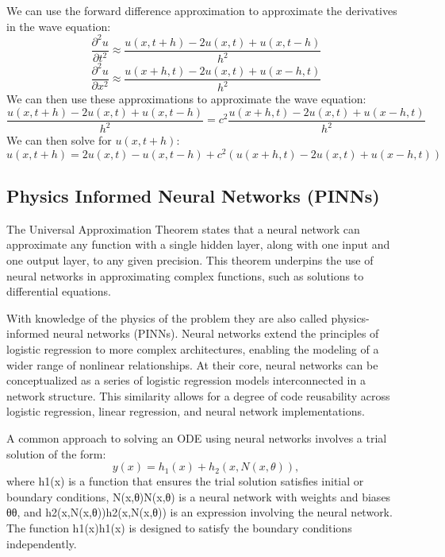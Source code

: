 \documentclass[twoside,11pt]{report}
\begin{document}
    We can use the forward difference approximation to approximate the derivatives in the wave equation:
    \begin{equation}
    \frac{\partial^2 u}{\partial t^2} \approx \frac{u(x,t+h) - 2u(x,t) + u(x,t-h)}{h^2}
    \end{equation}
    \begin{equation}
    \frac{\partial^2 u}{\partial x^2} \approx \frac{u(x+h,t) - 2u(x,t) + u(x-h,t)}{h^2}
    \end{equation}
    We can then use these approximations to approximate the wave equation:
    \begin{equation}
    \frac{u(x,t+h) - 2u(x,t) + u(x,t-h)}{h^2} = c^2 \frac{u(x+h,t) - 2u(x,t) + u(x-h,t)}{h^2}
    \end{equation}
    We can then solve for $u(x,t+h)$:
    \begin{equation}
    u(x,t+h) = 2u(x,t) - u(x,t-h) + c^2(u(x+h,t) - 2u(x,t) + u(x-h,t))
    \end{equation}


\subsection{Physics Informed Neural Networks (PINNs)}
\label{sec:DNN}

    The Universal Approximation Theorem states that a neural network can approximate any 
    function with a single hidden layer, along with one input and one output layer, to any 
    given precision. This theorem underpins the use of neural networks in approximating complex functions, 
    such as solutions to differential equations.


    With knowledge of the physics of the problem they are also called physics-informed neural networks (PINNs).
    Neural networks extend the principles of logistic regression to more complex architectures, enabling the 
    modeling of a wider range of nonlinear relationships. At their core, neural networks can be conceptualized 
    as a series of logistic regression models interconnected in a network structure. This similarity allows for a 
    degree of code reusability across logistic regression, linear regression, and neural network implementations.
    
    A common approach to solving an ODE using neural networks involves a trial solution of the form:
    \begin{equation}
    y(x) = h_1(x) + h_2(x, N(x, \theta)),
    \end{equation}
    where h1(x) is a function that ensures the trial solution satisfies initial or 
    boundary conditions, N(x,θ)N(x,θ) is a neural network with weights and biases θθ, and 
    h2(x,N(x,θ))h2(x,N(x,θ)) is an expression involving the neural network. The function 
    h1(x)h1(x) is designed to satisfy the boundary conditions independently.
\end{document}
